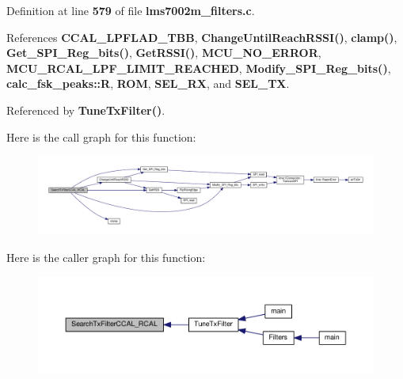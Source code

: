 Definition at line {\bf 579} of file {\bf lms7002m\+\_\+filters.\+c}.



References {\bf C\+C\+A\+L\+\_\+\+L\+P\+F\+L\+A\+D\+\_\+\+T\+BB}, {\bf Change\+Until\+Reach\+R\+S\+S\+I()}, {\bf clamp()}, {\bf Get\+\_\+\+S\+P\+I\+\_\+\+Reg\+\_\+bits()}, {\bf Get\+R\+S\+S\+I()}, {\bf M\+C\+U\+\_\+\+N\+O\+\_\+\+E\+R\+R\+OR}, {\bf M\+C\+U\+\_\+\+R\+C\+A\+L\+\_\+\+L\+P\+F\+\_\+\+L\+I\+M\+I\+T\+\_\+\+R\+E\+A\+C\+H\+ED}, {\bf Modify\+\_\+\+S\+P\+I\+\_\+\+Reg\+\_\+bits()}, {\bf calc\+\_\+fsk\+\_\+peaks\+::R}, {\bf R\+OM}, {\bf S\+E\+L\+\_\+\+RX}, and {\bf S\+E\+L\+\_\+\+TX}.



Referenced by {\bf Tune\+Tx\+Filter()}.



Here is the call graph for this function\+:
\nopagebreak
\begin{figure}[H]
\begin{center}
\leavevmode
\includegraphics[width=350pt]{d2/da6/lms7002m__filters_8c_aa9caab5ff4ebdb1cec1517f380af23d6_cgraph}
\end{center}
\end{figure}




Here is the caller graph for this function\+:
\nopagebreak
\begin{figure}[H]
\begin{center}
\leavevmode
\includegraphics[width=350pt]{d2/da6/lms7002m__filters_8c_aa9caab5ff4ebdb1cec1517f380af23d6_icgraph}
\end{center}
\end{figure}


